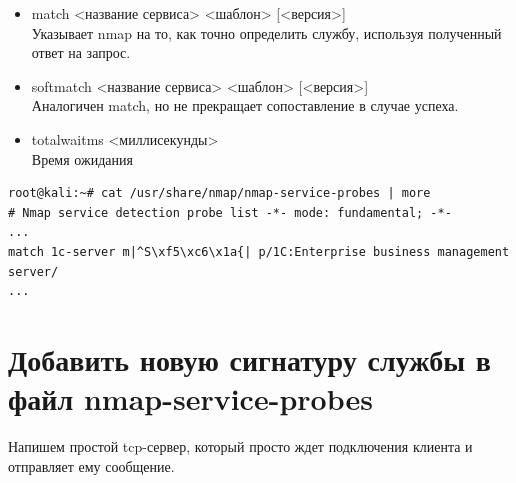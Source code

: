 \documentclass[utf8x, 12pt]{G7-32}
\begin{document}
\begin{enumerate}
\begin{itemize}
		\item match <название сервиса> <шаблон> [<версия>]\\
			Указывает nmap на то, как точно определить службу, используя полученный ответ на запрос.
		\item softmatch <название сервиса> <шаблон> [<версия>]\\
			Аналогичен match, но не прекращает сопоставление в случае успеха.
		\item totalwaitms <миллисекунды>\\
			Время ожидания
	\end{itemize}
\end{enumerate}

\begin{lstlisting}
root@kali:~# cat /usr/share/nmap/nmap-service-probes | more
# Nmap service detection probe list -*- mode: fundamental; -*-
...
match 1c-server m|^S\xf5\xc6\x1a{| p/1C:Enterprise business management server/
...
\end{lstlisting}

\newpage
\section{Добавить новую сигнатуру службы в файл nmap-service-probes}

Напишем простой tcp-сервер, который просто ждет подключения клиента и отправляет ему сообщение. 
\end{document}
